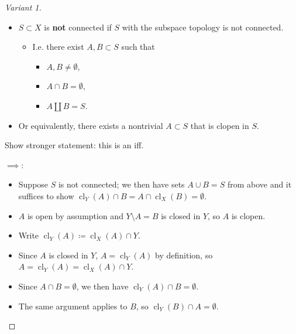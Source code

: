 \begin{solution}

\envlist

\begin{proof}[Variant 1]

\envlist

\begin{itemize}
\tightlist
\item
  \(S\subset X\) is \textbf{not } connected if \(S\) with the subspace
  topology is not connected.

  \begin{itemize}
  \tightlist
  \item
    I.e. there exist \(A, B \subset S\) such that

    \begin{itemize}
    \tightlist
    \item
      \(A, B \neq \emptyset\),
    \item
      \(A\cap B = \emptyset\),
    \item
      \(A {\textstyle\coprod}B = S\).
    \end{itemize}
  \end{itemize}
\item
  Or equivalently, there exists a nontrivial \(A\subset S\) that is
  clopen in \(S\).
\end{itemize}

Show stronger statement: this is an iff.

\(\implies\):

\begin{itemize}
\tightlist
\item
  Suppose \(S\) is not connected; we then have sets \(A \cup B = S\)
  from above and it suffices to show
  \({ \operatorname{cl}} _Y(A) \cap B = A \cap{ \operatorname{cl}} _X(B) = \emptyset\).
\item
  \(A\) is open by assumption and \(Y\setminus A = B\) is closed in
  \(Y\), so \(A\) is clopen.
\item
  Write
  \({ \operatorname{cl}} _Y(A) \coloneqq{ \operatorname{cl}} _X(A) \cap Y\).
\item
  Since \(A\) is closed in \(Y\), \(A = { \operatorname{cl}} _Y(A)\) by
  definition, so
  \(A = { \operatorname{cl}} _Y(A) = { \operatorname{cl}} _X(A) \cap Y\).
\item
  Since \(A\cap B = \emptyset\), we then have
  \({ \operatorname{cl}} _Y(A) \cap B = \emptyset\).
\item
  The same argument applies to \(B\), so
  \({ \operatorname{cl}} _Y(B) \cap A = \emptyset\).
\end{itemize}


\end{proof}
\end{solution}
